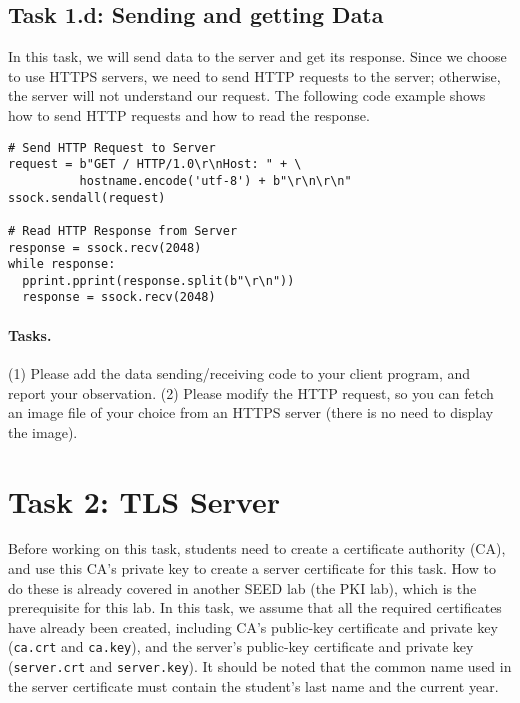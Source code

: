 \subsection{Task 1.d: Sending and getting Data}

In this task, we will send data to the server and get its 
response. Since we choose to use HTTPS servers, 
we need to send HTTP requests to the server; otherwise, the server
will not understand our request. 
The following code example shows how to send HTTP requests and how
to read the response. 


\begin{lstlisting}
# Send HTTP Request to Server
request = b"GET / HTTP/1.0\r\nHost: " + \
          hostname.encode('utf-8') + b"\r\n\r\n"
ssock.sendall(request)

# Read HTTP Response from Server
response = ssock.recv(2048)
while response:
  pprint.pprint(response.split(b"\r\n"))
  response = ssock.recv(2048)
\end{lstlisting}


\paragraph{Tasks.} (1) Please add the data sending/receiving code to your client program, and
report your observation.  (2) Please modify the HTTP request, so you can
fetch an image file of your choice from an HTTPS server (there is 
no need to display the image). 



\section{Task 2: TLS Server}

Before working on this task, students need to create a 
certificate authority (CA), and use this CA's private key
to create a server certificate for this task. 
How to do these is already covered in another SEED lab (the PKI lab),
which is the prerequisite for this lab. In this task, we assume that
all the required certificates have already been created, including
CA's public-key certificate and private key (\texttt{ca.crt} and \texttt{ca.key}), 
and the server's public-key certificate and private 
key (\texttt{server.crt} and \texttt{server.key}). 
It should be noted that the common name used in the server certificate 
must contain the student's last name and the current year. 


